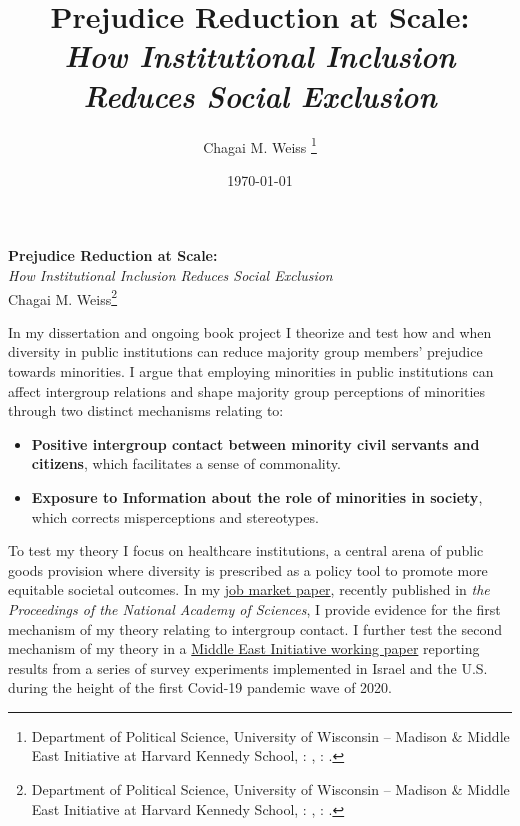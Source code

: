\documentclass[12pt]{article}
\theoremstyle{plain}
\begin{document}
\singlespace
\title{\large{\textbf{Prejudice Reduction at Scale: \\}
{\emph{How Institutional Inclusion Reduces Social Exclusion}}}}



\author{Chagai M. Weiss \thanks{Department of Political Science, University of Wisconsin -- Madison \& Middle East Initiative at Harvard Kennedy School, \faEnvelopeO: \href{mailto:cmweiss3@wisc.edu}{}, \faGlobe: \href{www.chagaiweiss.com}{}.}}


\date{\today\\}

\onehalfspacing
\begin{center}
\Large{\textbf{Prejudice Reduction at Scale:} \\}
\large{{\emph{How Institutional Inclusion Reduces Social Exclusion}}\\
Chagai M. Weiss}\footnote{Department of Political Science, University of Wisconsin -- Madison \& Middle East Initiative at Harvard Kennedy School, \faEnvelopeO: \href{mailto:cmweiss3@wisc.edu}{}, \faGlobe: \href{www.chagaiweiss.com}{}.}
\end{center}


\noindent In my dissertation and ongoing book project I theorize and test how and when diversity in public institutions can reduce majority group members' prejudice towards minorities. I argue that employing minorities in public institutions can affect intergroup relations and shape majority group perceptions of minorities through two distinct mechanisms relating to:


\begin{itemize}
\item \textbf{Positive intergroup contact between minority civil servants and citizens}, which facilitates a sense of commonality.
\item \textbf{Exposure to Information about the role of minorities in society}, which corrects misperceptions and stereotypes.
\end{itemize}


To test my theory I focus on healthcare institutions, a central arena of public goods provision where diversity is prescribed as a policy tool to promote more equitable societal outcomes. In my \href{https://www.pnas.org/doi/10.1073/pnas.2022634118}{job market paper}, recently published in \emph{the Proceedings of the National Academy of Sciences}, I provide evidence for the first mechanism of my theory relating to intergroup contact. I further test the second mechanism of my theory in a \href{https://www.chagaiweiss.com/papers/inprogress/mei_diveristy.pdf}{Middle East Initiative working paper} reporting results from a series of survey experiments implemented in Israel and the U.S. during the height of the first Covid-19 pandemic wave of 2020.
\end{document}
